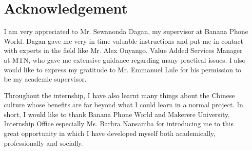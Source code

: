 \cleardoublepage
{}
\chapter*{Acknowledgement}


\noindent I am very appreciated to Mr. Sewanonda Dagan, my supervisor at Banana Phone World. Dagan gave me very in-time valuable instructions and put me in contact with experts in the field like Mr.
Alex Onyango, Value Added Services Manager at MTN, who gave me extensive guidance regarding many practical issues. I also would like to express my gratitude to Mr. Emmanuel Lule  for his permission to be my academic supervisor. \medskip

\noindent Throughout the internship, I have also learnt many things about the Chinese culture whose
benefits are far beyond what I could learn in a normal project. In short, I would like to thank
Banana Phone World and Makerere University, Internship Office especially Ms. Barbra Nansamba  for introducing me to this great opportunity in which I have developed myself both academically, professionally and socially.


\newpage



